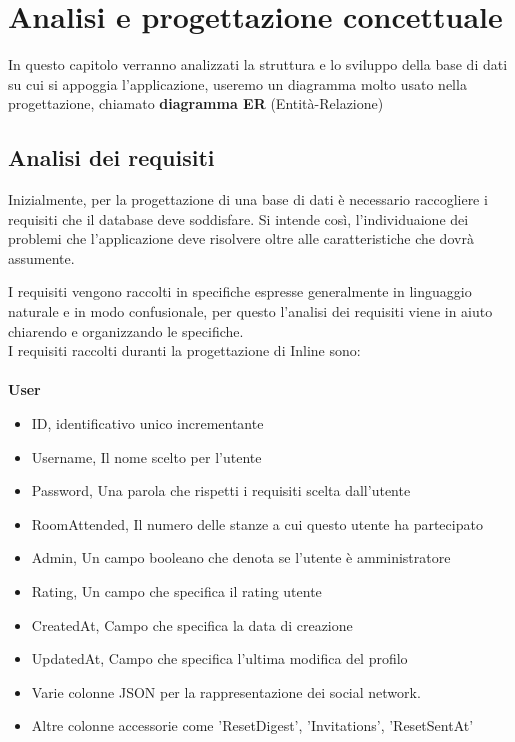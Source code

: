 \chapter{Analisi e progettazione concettuale}

In questo capitolo verranno analizzati la struttura e lo sviluppo della base di dati su cui si appoggia l'applicazione, useremo un diagramma molto usato nella progettazione, chiamato \textbf{diagramma ER} (Entità-Relazione)

\section{Analisi dei requisiti}

Inizialmente, per la progettazione di una base di dati è necessario raccogliere i requisiti che il database deve soddisfare. Si intende così, l'individuaione dei problemi che l'applicazione deve risolvere oltre alle caratteristiche che dovrà assumente.

I requisiti vengono raccolti in specifiche espresse generalmente in linguaggio naturale e in modo confusionale, per questo l'analisi dei requisiti viene in aiuto chiarendo e organizzando le specifiche. 
\\
I requisiti raccolti duranti la progettazione di Inline sono:\\\\
\textbf{User}
\begin{itemize}
	\item ID, identificativo unico incrementante
	\item Username, Il nome scelto per l'utente
	\item Password, Una parola che rispetti i requisiti scelta dall'utente
	\item RoomAttended, Il numero delle stanze a cui questo utente ha partecipato
	\item Admin, Un campo booleano che denota se l'utente è amministratore
	\item Rating, Un campo che specifica il rating utente
	\item CreatedAt, Campo che specifica la data di creazione
	\item UpdatedAt, Campo che specifica l'ultima modifica del profilo
	\item Varie colonne JSON per la rappresentazione dei social network.
	\item Altre colonne accessorie come 'ResetDigest', 'Invitations', 'ResetSentAt'
\end{itemize}

